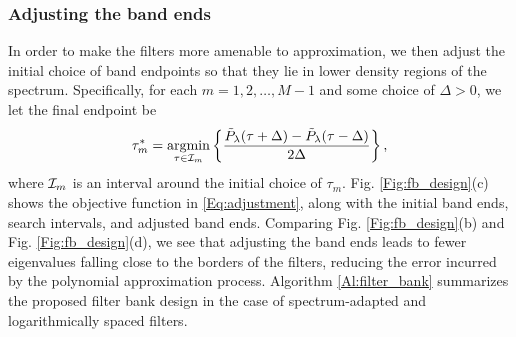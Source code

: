 \documentclass[journal, 10pt]{IEEEtran}
\begin{document}
\begin{figure}[tb]
\end{figure}

\subsubsection{Adjusting the band ends} \label{Se:adjust}

In order to make the filters more amenable to approximation, we then adjust the initial choice of band endpoints so that they lie in lower density regions of the spectrum. Specifically, for each $m=1,2,\ldots,M-1$ and some choice of $\Delta>0$, we let the final endpoint be
\begin{align} \label{Eq:adjustment}
\tau_m^* = \argmin_{\tau \in {\cal I}_m} \left\{\frac{\tilde{P}_{\lambda}(\tau+\Delta)-\tilde{P}_{\lambda}(\tau-\Delta)}{2\Delta}\right\},
\end{align}
where ${\cal I}_m$ is an interval around the initial choice of $\tau_m$. Fig. \ref{Fig:fb_design}(c) shows the objective function in \eqref{Eq:adjustment}, along with the initial band ends, search intervals, and adjusted band ends. Comparing Fig. \ref{Fig:fb_design}(b) and Fig. \ref{Fig:fb_design}(d), we 
see that adjusting the band ends leads to fewer eigenvalues falling close to the borders of the filters, reducing the error incurred by the polynomial approximation process. Algorithm \ref{Al:filter_bank} summarizes the proposed filter bank design in the case of spectrum-adapted and logarithmically spaced filters.
 
\end{document}
